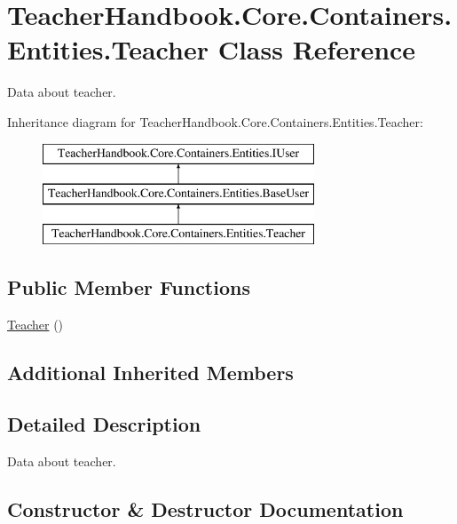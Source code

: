 \hypertarget{class_teacher_handbook_1_1_core_1_1_containers_1_1_entities_1_1_teacher}{}\section{Teacher\+Handbook.\+Core.\+Containers.\+Entities.\+Teacher Class Reference}
\label{class_teacher_handbook_1_1_core_1_1_containers_1_1_entities_1_1_teacher}


Data about teacher.  


Inheritance diagram for Teacher\+Handbook.\+Core.\+Containers.\+Entities.\+Teacher\+:\begin{figure}[H]
\begin{center}
\leavevmode
\includegraphics[height=3.000000cm]{d5/d63/class_teacher_handbook_1_1_core_1_1_containers_1_1_entities_1_1_teacher}
\end{center}
\end{figure}
\subsection*{Public Member Functions}
\begin{DoxyCompactItemize}
\item 
\mbox{\hyperlink{class_teacher_handbook_1_1_core_1_1_containers_1_1_entities_1_1_teacher_ad02f1edfb4ccf083314696c9a3a5248b}{Teacher}} ()
\end{DoxyCompactItemize}
\subsection*{Additional Inherited Members}


\subsection{Detailed Description}
Data about teacher. 



\subsection{Constructor \& Destructor Documentation}
\mbox{\label{class_teacher_handbook_1_1_core_1_1_containers_1_1_entities_1_1_teacher_ad02f1edfb4ccf083314696c9a3a5248b}} 
